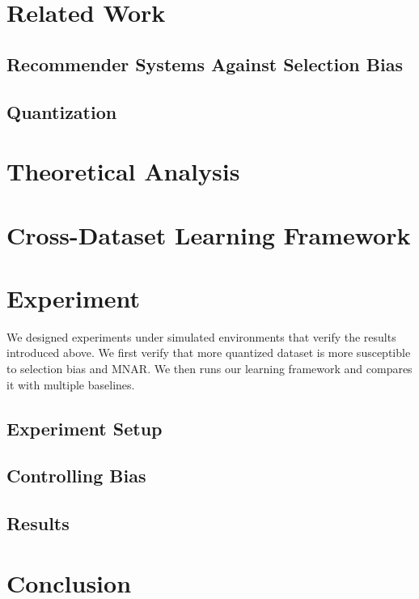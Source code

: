 \documentclass[12pt, letterpaper]{article}
\theoremstyle{definition}\newtheorem*{definition}{Definition}
\theoremstyle{definition}\newtheorem*{example}{Example}
\theoremstyle{definition}\newtheorem*{remark}{Remark}
\begin{document}
\section{Related Work}

\subsection{Recommender Systems Against Selection Bias}

\subsection{Quantization}

\section{Theoretical Analysis}

\section{Cross-Dataset Learning Framework}

\section{Experiment}
We designed experiments under simulated environments that verify the results introduced above. We first verify that more quantized dataset is more susceptible to selection bias and MNAR. We then runs our learning framework and compares it with multiple baselines.

\subsection{Experiment Setup}

\subsection{Controlling Bias}

\subsection{Results}

\section{Conclusion}
\end{document}
